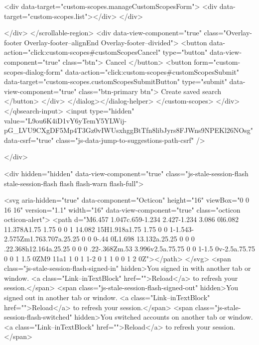         <div data-target="custom-scopes.manageCustomScopesForm">
          <div data-target="custom-scopes.list"></div>
        </div>

</div>
      </scrollable-region>
      <div data-view-component="true" class="Overlay-footer Overlay-footer--alignEnd Overlay-footer--divided">          <button data-action="click:custom-scopes#customScopesCancel" type="button" data-view-component="true" class="btn">    Cancel
</button>
          <button form="custom-scopes-dialog-form" data-action="click:custom-scopes#customScopesSubmit" data-target="custom-scopes.customScopesSubmitButton" type="submit" data-view-component="true" class="btn-primary btn">    Create saved search
</button>
</div>
</dialog></dialog-helper>
    </custom-scopes>
  </div>
</qbsearch-input>  <input type="hidden" value="L9ou6K4iD1vY6yTemY5YLWij-pG_LVU9CXgDF5Mp4T3Gz0vIWUsxhggBtTfn8libJyrs8FJWns9NPEKl26NOsg" data-csrf="true" class="js-data-jump-to-suggestions-path-csrf" />


      </div>


      <div hidden="hidden" data-view-component="true" class="js-stale-session-flash stale-session-flash flash flash-warn flash-full">
  
        <svg aria-hidden="true" data-component="Octicon" height="16" viewBox="0 0 16 16" version="1.1" width="16" data-view-component="true" class="octicon octicon-alert">
    <path d="M6.457 1.047c.659-1.234 2.427-1.234 3.086 0l6.082 11.378A1.75 1.75 0 0 1 14.082 15H1.918a1.75 1.75 0 0 1-1.543-2.575Zm1.763.707a.25.25 0 0 0-.44 0L1.698 13.132a.25.25 0 0 0 .22.368h12.164a.25.25 0 0 0 .22-.368Zm.53 3.996v2.5a.75.75 0 0 1-1.5 0v-2.5a.75.75 0 0 1 1.5 0ZM9 11a1 1 0 1 1-2 0 1 1 0 0 1 2 0Z"></path>
</svg>
        <span class="js-stale-session-flash-signed-in" hidden>You signed in with another tab or window. <a class="Link--inTextBlock" href="">Reload</a> to refresh your session.</span>
        <span class="js-stale-session-flash-signed-out" hidden>You signed out in another tab or window. <a class="Link--inTextBlock" href="">Reload</a> to refresh your session.</span>
        <span class="js-stale-session-flash-switched" hidden>You switched accounts on another tab or window. <a class="Link--inTextBlock" href="">Reload</a> to refresh your session.</span>

